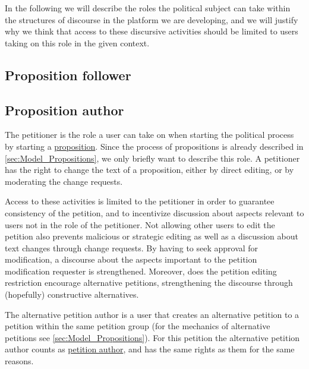 In the following we will describe the roles the political subject can take within the structures of discourse in the platform we are developing, and we will justify why we think that access to these discursive activities should be limited to users taking on this role in the given context.

\subsection{Proposition follower}

\subsection{Proposition author}
\label{ssec:Roles_Petitioner}
The petitioner is the role a user can take on when starting the political process by starting a \href{ssec:Model_Propositions}{proposition}. Since the process of propositions is already described in \ref{sec:Model_Propositions}, we only briefly want to describe this role. A petitioner has the right to change the text of a proposition, either by direct editing, or by moderating the change requests. 

Access to these activities is limited to the petitioner in order to guarantee consistency of the petition, and to incentivize discussion about aspects relevant to users not in the role of the petitioner. Not allowing other users to edit the petition also prevents malicious or strategic editing as well as a discussion about text changes through change requests. By having to seek approval for modification, a discourse about the aspects important to the petition modification requester is strengthened.
Moreover, does the petition editing restriction encourage alternative petitions, strengthening the discourse through (hopefully) constructive alternatives.

The alternative petition author is a user that creates an alternative petition to a petition within the same petition group (for the mechanics of alternative petitions see \ref{sec:Model_Propositions}). For this petition the alternative petition author counts as \href{sssec:Roles_Petitioner}{petition author}, and has the same rights as them for the same reasons.
% 
% 
% 

